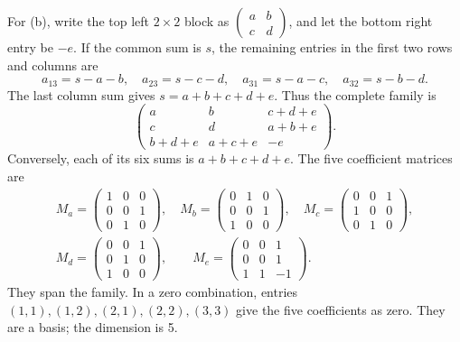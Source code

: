 \begin{solution}
For (b), write the top left \(2\times2\) block as
\(\left(\begin{smallmatrix}a&b\\c&d\end{smallmatrix}\right)\), and let
the bottom right entry be \(-e\). If the common sum is \(s\), the
remaining entries in the first two rows and columns are
\[
a_{13}=s-a-b,\quad a_{23}=s-c-d,\quad
a_{31}=s-a-c,\quad a_{32}=s-b-d.
\]
The last column sum gives \(s=a+b+c+d+e\). Thus the complete family is
\[
\begin{pmatrix}
a&b&c+d+e\\c&d&a+b+e\\b+d+e&a+c+e&-e
\end{pmatrix}.
\]
Conversely, each of its six sums is \(a+b+c+d+e\).
The five coefficient matrices are
\begin{gather*}
M_a=\begin{pmatrix}1&0&0\\0&0&1\\0&1&0\end{pmatrix},\quad
M_b=\begin{pmatrix}0&1&0\\0&0&1\\1&0&0\end{pmatrix},\quad
M_c=\begin{pmatrix}0&0&1\\1&0&0\\0&1&0\end{pmatrix},\\
M_d=\begin{pmatrix}0&0&1\\0&1&0\\1&0&0\end{pmatrix},\qquad
M_e=\begin{pmatrix}0&0&1\\0&0&1\\1&1&-1\end{pmatrix}.
\end{gather*}
They span the family. In a zero combination, entries \((1,1),(1,2),(2,1),(2,2),(3,3)\)
give the five coefficients as zero. They are a basis; the dimension is 5.
\end{solution}

